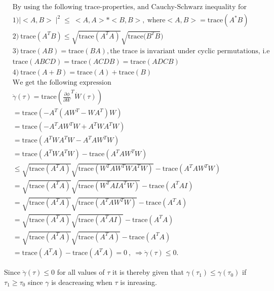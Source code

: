  \begin{equation}
 \label{eq: Verify 2}
 \begin{split}
 &\text{By using the following trace-properties, and Cauchy-Schwarz inequality for innerproduct:}\\
 & 1)\mid <A,B> \mid ^{2} \leq  \:<A,A>*<B,B>, \: \text{where} <A,B>=\text{trace}(A^{*}B) \\
 & 2)\: \text{trace}(A^{T}B)\leq\sqrt{\text{trace}(A^{T}A)}\sqrt{\text{trace}(B^{T}B}) \\
 & 3)\: \text{trace}(AB)=\text{trace}(BA), \text{the trace is invariant under cyclic permutations, i.e}\\
 & \text{trace}(ABCD)=\text{trace}(ACDB)=\text{trace}(ADCB)\\
 & 4)\: \text{trace}(A+B)=\text{trace}(A)+\text{trace}(B)\\
 &\text{We get the following expression}\\
 &\dot{\gamma}(\tau)=\text{trace}(\frac{\partial \phi}{\partial W}^{T} \dot{W}(\tau))\\
 &= \text{trace}(-A^{T}(AW^{T} -WA^{T})W)\\
 &= \text{trace}(-A^{T}AW^{T}W+A^{T}WA^{T}W)\\
 &= \text{trace}(A^{T}WA^{T}W-A^{T}AW^{T}W) \\
 &= \text{trace}(A^{T}WA^{T}W) -\text{trace}(A^{T}AW^{T}W)\\
 &\leq \sqrt{\text{trace}(A^{T}A)} \sqrt{\text{trace}(W^{T}AW^{T}WA^{T}W)} -\text{trace}(A^{T}AW^{T}W)\\
 &=\sqrt{\text{trace}(A^{T}A)} \sqrt{\text{trace}(W^{T}AIA^{T}W)} -\text{trace}(A^{T}AI)\\
 &=\sqrt{\text{trace}(A^{T}A)} \sqrt{\text{trace}(A^{T}AW^{T}W)} -\text{trace}(A^{T}A)\\
 &=\sqrt{\text{trace}(A^{T}A)} \sqrt{\text{trace}(A^{T}AI)} -\text{trace}(A^{T}A)\\
 &=\sqrt{\text{trace}(A^{T}A)} \sqrt{\text{trace}(A^{T}A)} -\text{trace}(A^{T}A)\\
 &=\text{trace}(A^{T}A) -\text{trace}(A^{T}A)=0\: , \: \Longrightarrow \dot{\gamma}(\tau) \leq 0.
 \end{split}
 \end{equation}
 
 Since $\dot{\gamma}(\tau)\leq 0$ for all values of $\tau$ it is thereby given that $\gamma(\tau_1) \leq \gamma(\tau_0)$ if $\tau_1 \geq \tau_0$ since $\gamma$ is deacreasing when $\tau$ is inreasing.
 
